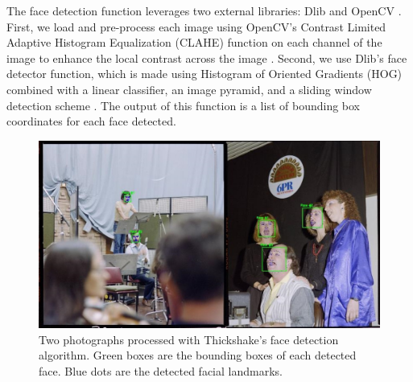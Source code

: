 \documentclass[10pt, a4paper]{article}
\begin{document}
The face detection function leverages two external libraries: Dlib \cite{dlib} and OpenCV \cite{opencv}. First, we load and pre-process each image using OpenCV's Contrast Limited Adaptive Histogram Equalization (CLAHE) function on each channel of the image to enhance the local contrast across the image \cite{opencv_clahe}. Second, we use Dlib's face detector function, which is made using Histogram of Oriented Gradients (HOG) combined with a linear classifier, an image pyramid, and a sliding window detection scheme \cite{dlib_face}. The output of this function is a list of bounding box coordinates for each face detected.

\begin{figure}[ht]
  \centering
  \includegraphics[width=\columnwidth]{figures/face_detection.jpg}
  \caption{Two photographs processed with Thickshake's face detection algorithm. Green boxes are the bounding boxes of each detected face. Blue dots are the detected facial landmarks.}
  \label{figure:face_detection:images}
\end{figure}
\end{document}
